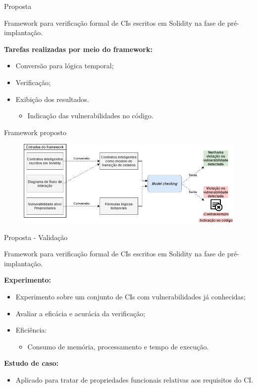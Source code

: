 \begin{frame}{Proposta}
    \begin{block}{}
    Framework para verificação formal de CIs escritos em Solidity na fase de pré-implantação.
    \end{block}
    \textbf{Tarefas realizadas por meio do framework:}
    \begin{itemize}
        \item Conversão para lógica temporal;
        \item Verificação;
        \item Exibição dos resultados.
        \begin{itemize}
            \item Indicação das vulnerabilidades no código.
        \end{itemize}
    \end{itemize}
\end{frame}

\begin{frame}{Framework proposto}
	\begin{figure}[!htb]
		\centering
		\includegraphics[scale=0.4]{figuras/proposta/framework.png}
	\end{figure}    
\end{frame}

\begin{frame}{Proposta - Validação}
    \begin{block}{}
    Framework para verificação formal de CIs escritos em Solidity na fase de pré-implantação.
    \end{block}
    \textbf{Experimento:} 
    \begin{itemize}
        \item Experimento sobre um conjunto de CIs com vulnerabilidades já conhecidas;
        \item Avaliar a eficácia e acurácia da verificação;
        \item Eficiência:
        \begin{itemize}
            \item Consumo de memória, processamento e tempo de execução.
        \end{itemize}
    \end{itemize}
    \textbf{Estudo de caso:}
    \begin{itemize}
        \item Aplicado para tratar de propriedades funcionais relativas aos requisitos do CI.
    \end{itemize}    
\end{frame}

